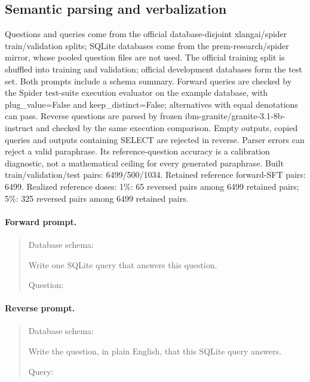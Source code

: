 \subsection{Semantic parsing and verbalization}
Questions and queries come from the official database-disjoint xlangai/spider train/validation splits; SQLite databases come from the prem-research/spider mirror, whose pooled question files are not used. The official training split is shuffled into training and validation; official development databases form the test set. Both prompts include a schema summary. Forward queries are checked by the Spider test-suite execution evaluator on the example database, with plug\_value=False and keep\_distinct=False; alternatives with equal denotations can pass. Reverse questions are parsed by frozen ibm-granite/granite-3.1-8b-instruct and checked by the same execution comparison. Empty outputs, copied queries and outputs containing SELECT are rejected in reverse. Parser errors can reject a valid paraphrase. Its reference-question accuracy is a calibration diagnostic, not a mathematical ceiling for every generated paraphrase.
Built train/validation/test pairs: 6499/500/1034. Retained reference forward-SFT pairs: 6499. 
Realized reference doses: 1\%: 65 reversed pairs among 6499 retained pairs; 5\%: 325 reversed pairs among 6499 retained pairs.
\paragraph{Forward prompt.}
\begin{quote}\small\ttfamily
Database schema:\par <DATABASE SCHEMA>\par \par Write one SQLite query that answers this question.\par \par Question:\par <INPUT A>
\end{quote}
\paragraph{Reverse prompt.}
\begin{quote}\small\ttfamily
Database schema:\par <DATABASE SCHEMA>\par \par Write the question, in plain English, that this SQLite query answers.\par \par Query:\par <INPUT B>
\end{quote}
